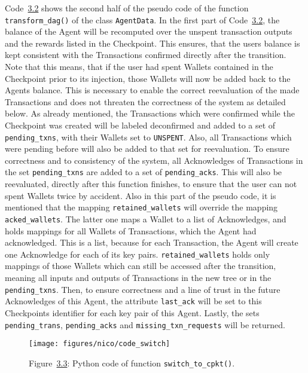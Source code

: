 Code~\hyperref[pseudo_transform_dag_2]{3.2} shows the second half of the pseudo code of the function  \\\texttt{transform\_dag()} of the class \texttt{AgentData}. In the first part of Code~\hyperref[pseudo_transform_dag_2]{3.2}, the balance of the Agent will be recomputed over the unspent transaction outputs and the rewards listed in the Checkpoint. This ensures, that the users balance is kept consistent with the Transactions confirmed directly after the transition. Note that this means, that if the user had spent Wallets contained in the Checkpoint prior to its injection, those Wallets will now be added back to the Agents balance. This is necessary to enable the correct reevaluation of the made Transactions and does not threaten the correctness of the system as detailed below. 
As already mentioned, the Transactions which were confirmed while the Checkpoint was created will be labeled deconfirmed and added to a set of \texttt{pending\_txns}, with their Wallets set to \texttt{UNSPENT}. Also, all Transactions which were pending before will also be added to that set for reevaluation. To ensure correctness and to consistency of the system, all Acknowledges of Transactions in the set \texttt{pending\_txns} are added to a set of \texttt{pending\_acks}. This will also be reevaluated, directly after this function finishes, to ensure that the user can not spent Wallets twice by accident. Also in this part of the pseudo code, it is mentioned that the mapping \texttt{retained\_wallets} will override the mapping \texttt{acked\_wallets}. The latter one maps a Wallet to a list of Acknowledges, and holds mappings for all Wallets of Transactions, which the Agent had acknowledged. This is a list, because for each Transaction, the Agent will create one Acknowledge for each of its key pairs. \texttt{retained\_wallets} holds only mappings of those Wallets which can still be accessed after the transition, meaning all inputs and outputs of Transactions in the new tree or in the \texttt{pending\_txns}.
Then, to ensure correctness and a line of trust in the future Acknowledges of this Agent, the attribute \texttt{last\_ack} will be set to this Checkpoints identifier for each key pair of this Agent.
Lastly, the sets \texttt{pending\_trans}, \texttt{pending\_acks} and \texttt{missing\_txn\_requests} will be returned.

\begin{figure}[htbp]
	\centering
	\label{fig:code_switch}
	\texttt{[image: figures/nico/code\_switch]}
	
	\footnotesize{Figure~\hyperref[fig:code_switch]{3.3}: Python code of function \texttt{switch\_to\_cpkt()}.}
\end{figure}

